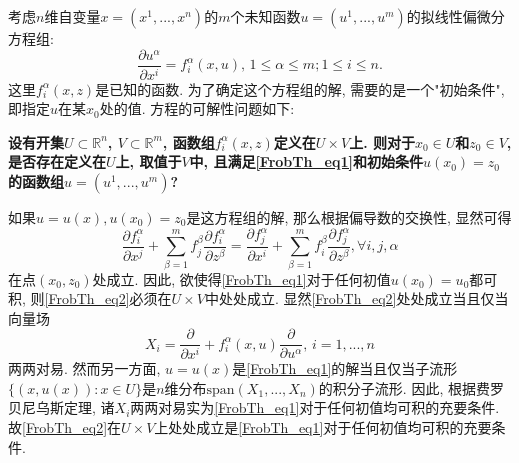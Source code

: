 考虑$n$维自变量$x=(x^1,...,x^n)$的$m$个未知函数$u=(u^1,...,u^m)$的拟线性偏微分方程组:
\begin{equation}\label{FrobTh_eq1}
\frac{\partial u^\alpha}{\partial x^i}=f_i^\alpha(x,u),\,1\leq\alpha\leq m;1\leq i\leq n.
\end{equation}
这里$f_i^\alpha(x,z)$是已知的函数. 为了确定这个方程组的解, 需要的是一个"初始条件", 即指定$u$在某$x_0$处的值. 方程的可解性问题如下:

\textbf{设有开集$U\subset\mathbb{R}^n$, $V\subset\mathbb{R}^m$, 函数组$f_i^\alpha(x,z)$定义在$U\times V$上. 则对于$x_0\in U$和$z_0\in V$, 是否存在定义在$U$上, 取值于$V$中, 且满足\autoref{FrobTh_eq1}和初始条件$u(x_0)=z_0$的函数组$u=(u^1,...,u^m)$?}

如果$u=u(x),u(x_0)=z_0$是这方程组的解, 那么根据偏导数的交换性, 显然可得
\begin{equation}\label{FrobTh_eq2}
\frac{\partial f_i^\alpha}{\partial x^j}+\sum_{\beta=1}^mf_j^\beta\frac{\partial f_i^\alpha}{\partial z^\beta}
=\frac{\partial f_j^\alpha}{\partial x^i}+\sum_{\beta=1}^mf_i^\beta\frac{\partial f_j^\alpha}{\partial z^\beta},\forall i,j,\alpha
\end{equation}
在点$(x_0,z_0)$处成立. 因此, 欲使得\autoref{FrobTh_eq1}对于任何初值$u(x_0)=u_0$都可积, 则\autoref{FrobTh_eq2}必须在$U\times V$中处处成立. 显然\autoref{FrobTh_eq2}处处成立当且仅当向量场
$$
X_i=\frac{\partial}{\partial x^i}+f_i^\alpha(x,u)\frac{\partial}{\partial u^\alpha},\,i=1,...,n
$$
两两对易. 然而另一方面, $u=u(x)$是\autoref{FrobTh_eq1}的解当且仅当子流形$\{(x,u(x)):x\in U\}$是$n$维分布$\text{span}(X_1,...,X_n)$的积分子流形. 因此, 根据费罗贝尼乌斯定理, 诸$X_i$两两对易实为\autoref{FrobTh_eq1}对于任何初值均可积的充要条件. 故\autoref{FrobTh_eq2}在$U\times V$上处处成立是\autoref{FrobTh_eq1}对于任何初值均可积的充要条件.